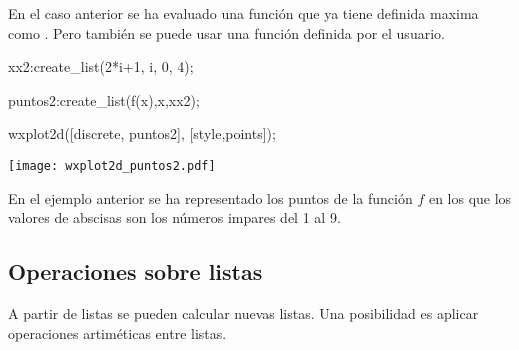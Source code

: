 En el caso anterior se ha evaluado una función que ya
tiene definida maxima como .
Pero también se puede usar una función definida por el usuario.
\begin{maximai}
	xx2:create_list(2*i+1, i, 0, 4);
\end{maximai}\begin{maximao}
	\left[ 1 , 3 , 5 , 7 , 9 \right]
\end{maximao}\begin{maximai}
	puntos2:create_list(f(x),x,xx2);
\end{maximai}\begin{maximao}
	\left[ 1 , 13 , 73 , 229 , 529 \right] 
\end{maximao}\begin{maximai}
	wxplot2d([discrete, puntos2], [style,points]);
\end{maximai}\begin{maximat}
	\begin{center}
		\texttt{[image: wxplot2d\_puntos2.pdf]}
	\end{center}
\end{maximat}

En el ejemplo anterior se ha representado los puntos
de la función $f$ en los que los valores
de abscisas son los números impares del 1 al 9.


\subsection*{Operaciones sobre listas}

A partir de listas se pueden calcular nuevas listas.
Una posibilidad es aplicar operaciones artiméticas
entre listas.


